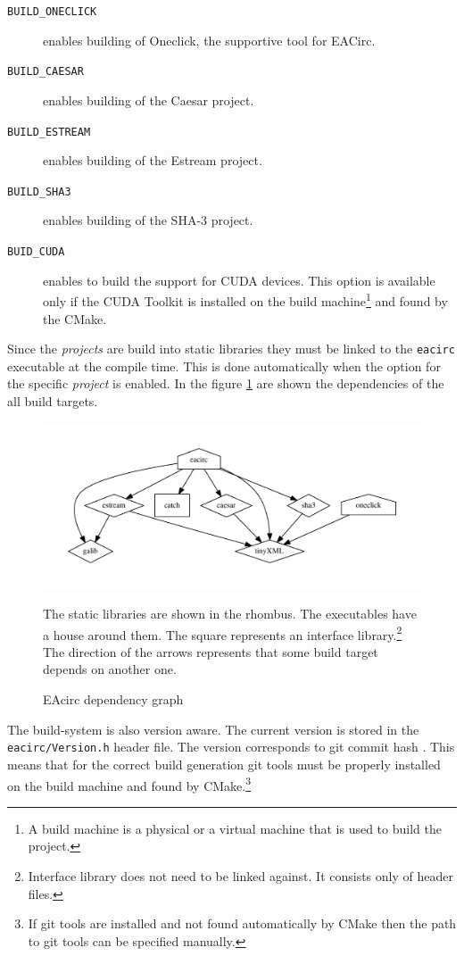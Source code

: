 \documentclass[12pt,oneside]{fithesis2}
\begin{document}
\begin{description}
	\item[\texttt{BUILD\_ONECLICK}] enables building of Oneclick, the supportive tool for EACirc.
	
	\item[\texttt{BUILD\_CAESAR}] enables building of the Caesar project.
	
	\item[\texttt{BUILD\_ESTREAM}] enables building of the Estream project.
	
	\item[\texttt{BUILD\_SHA3}] enables building of the SHA-3 project.
	
	\item[\texttt{BUID\_CUDA}] enables to build the support for CUDA devices. This option is available only if the CUDA Toolkit \cite{cuda_toolkit} is installed on the build machine\footnote{A build machine is a physical or a virtual machine that is used to build the project.} and found by the CMake.
\end{description}

\noindent
Since the \emph{projects} are build into static libraries they must be linked to the \texttt{eacirc} executable at the compile time. This is done automatically when the option for the specific \emph{project} is enabled. In the figure \ref{fig:deps} are shown the dependencies of the all build targets.
	\begin{figure}[H]
	\centering
	\includegraphics[width=.8\textwidth]{figures/deps}
	\caption{EAcirc dependency graph}
	\label{fig:deps}
	\small
	The static libraries are shown in the rhombus. The executables have a house around them. The square represents an interface library.\footnote{Interface library does not need to be linked against. It consists only of header files.} The direction of the arrows represents that some build target depends on another one.
	\end{figure}

\noindent
The build-system is also version aware. The current version is stored in the \texttt{eacirc/Version.h} header file. The version corresponds to git commit hash \cite{git_book}. This means that for the correct build generation git tools must be properly installed on the build machine and found by CMake.\footnote{If git tools are installed and not found automatically by CMake then the path to git tools can be specified manually.}
\end{document}
